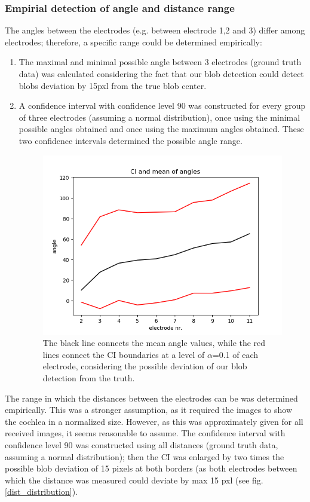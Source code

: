 \documentclass[a4paper, 10pt, twocolumn]{article}
\begin{document}
\subsubsection{Empirial detection of angle and distance range}
The angles between the electrodes (e.g. between electrode 1,2 and 3) differ among electrodes; therefore, a specific range could be determined empirically: 
\begin{enumerate}
\item The maximal and minimal possible angle between 3 electrodes (ground truth data) was calculated considering the fact that our blob detection could detect blobs deviation by 15pxl from the true blob center. 
\item A confidence interval with confidence level 90 was constructed for every group of three electrodes (assuming a normal distribution), once using the minimal possible angles obtained and once using the maximum angles obtained. These two confidence intervals determined the possible angle range.
\begin{figure}[ht]
	\centering
  \includegraphics[width=.5\textwidth]{CI_and_mean_of_angles.png}
	\caption{The black line connects the mean angle values, while the red lines connect the CI boundaries at a level of $\alpha$=0.1 of each electrode, considering the possible deviation of our blob detection from the truth.} %
	\label{mean_angles}
\end{figure}
\end{enumerate}
The range in which the distances between the electrodes can be was determined empirically. This was a stronger assumption, as it required the images to show the cochlea in a normalized size. However, as this was approximately given for all received images, it seems reasonable to assume. The confidence interval with confidence level 90 was constructed using all distances (ground truth data, assuming a normal distribution); then the CI was enlarged by two times the possible blob deviation of 15 pixels at both borders (as both electrodes between which the distance was measured could deviate by max 15 pxl (see fig. \ref{dist_distribution}). 
\end{document}
